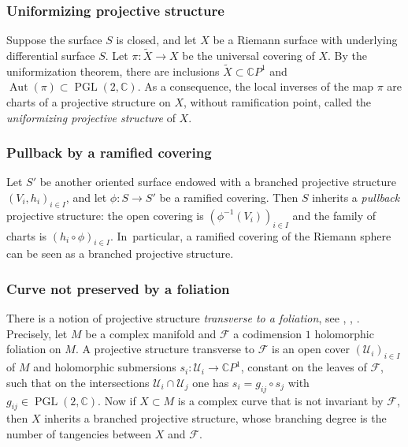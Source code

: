 \documentclass[10pt]{amsart}
\newcommand{\C}{\mathbb C}
\newcommand{\CP}{\mathbb CP}
\DeclareMathOperator{\Aut}{Aut}
\DeclareMathOperator{\PGL}{PGL}
\theoremstyle{definition}
\theoremstyle{plain}
\begin{document}
\subsubsection*{Uniformizing projective structure}
Suppose the surface $S$ is closed, and let $X$ be a Riemann surface with underlying differential surface $S$.
Let $\pi: \widetilde X \to X$ be the universal covering of $X$.
By the uniformization theorem, there are inclusions $\widetilde X \subset \CP^1$ and $\Aut(\pi) \subset \PGL(2, \C)$.
As a consequence, the local inverses of the map $\pi$ are charts of a projective structure on $X$, without ramification point, called the \emph{uniformizing projective structure} of $X$.

\subsubsection*{Pullback by a ramified covering}
Let $S'$ be another oriented surface endowed with a branched projective structure $(V_i, h_i)_{i \in I}$, and let $\phi: S \to S'$ be a ramified covering.
Then $S$ inherits a \emph{pullback} projective structure: the open covering is $\left(\phi^{-1}(V_i)\right)_{i \in I}$ and the family of charts is $(h_i \circ \phi)_{i \in I}$. In~particular, a ramified covering of the Riemann sphere can be seen as a branched projective structure.

\subsubsection*{Curve not preserved by a foliation}
There is a notion of projective structure \emph{transverse to a foliation}, see \cite{blumenthal}, \cite{godbillon}, \cite{scardua}.
Precisely, let $M$ be a complex manifold and $\mathcal F$ a codimension $1$ holomorphic foliation on $M$.
A projective structure transverse to $\mathcal F$ is an open cover $(\mathcal U_i)_{i \in I}$ of $M$ and holomorphic submersions $s_i: \mathcal U_i \to \CP^1$, constant on the leaves of $\mathcal F$, such that on the intersections $\mathcal U_i \cap \mathcal U_j$ one has $s_i = g_{ij} \circ s_j$ with $g_{ij} \in \PGL(2, \C)$.
Now if $X \subset M$ is a complex curve that is not invariant by $\mathcal F$, then $X$ inherits a branched projective structure, whose branching degree is the number of tangencies between $X$ and $\mathcal F$.
\end{document}
